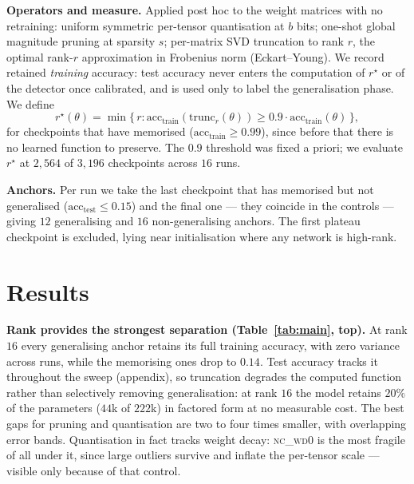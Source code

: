 \documentclass{article}
\begin{document}
\textbf{Operators and measure.} Applied post hoc to the weight matrices with no
retraining: uniform symmetric per-tensor quantisation at $b$ bits; one-shot global
magnitude pruning at sparsity $s$; per-matrix SVD truncation to rank $r$, the optimal
rank-$r$ approximation in Frobenius norm (Eckart--Young). We record retained \emph{training} accuracy: test accuracy never enters the computation
of $r^\star$ or of the detector once calibrated, and is used only to label the
generalisation phase. We define
\[
r^\star(\theta) = \min \{\, r : \mathrm{acc}_{\text{train}}(\mathrm{trunc}_r(\theta))
\geq 0.9 \cdot \mathrm{acc}_{\text{train}}(\theta) \,\},
\]
for checkpoints that have memorised ($\mathrm{acc}_{\text{train}} \geq 0.99$), since
before that there is no learned function to preserve. The $0.9$ threshold was fixed a
priori; we evaluate $r^\star$ at $2{,}564$ of $3{,}196$ checkpoints across $16$ runs.

\textbf{Anchors.} Per run we take the last checkpoint that has memorised but not
generalised ($\mathrm{acc}_{\text{test}} \leq 0.15$) and the final one --- they coincide
in the controls --- giving $12$ generalising and $16$ non-generalising anchors. The
first plateau checkpoint is excluded, lying near initialisation where any network is
high-rank.

\section{Results}

\textbf{Rank provides the strongest separation (Table~\ref{tab:main}, top).} At rank $16$ every
generalising anchor retains its full training accuracy, with zero variance across runs,
while the memorising ones drop to $0.14$. Test accuracy tracks it throughout the
sweep (appendix), so truncation degrades the computed function rather than selectively
removing generalisation: at rank $16$ the model retains $20\%$ of the parameters ($44$k of $222$k) in factored form at no measurable cost. The best gaps for pruning and quantisation
are two to four times smaller, with overlapping error bands. Quantisation in fact tracks weight decay: \textsc{nc\_wd0} is the most fragile of all
under it, since large outliers survive and inflate the per-tensor scale --- visible only
because of that control.
\end{document}
